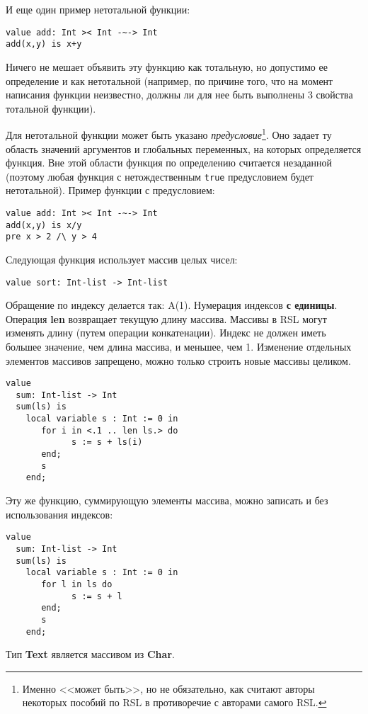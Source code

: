 И еще один пример нетотальной функции:
\begin{lstlisting}
value add: Int >< Int -~-> Int
add(x,y) is x+y
\end{lstlisting}
Ничего не мешает объявить эту функцию как тотальную, но допустимо ее определение и как нетотальной (например, по причине того, что на момент написания функции неизвестно, должны ли для нее быть выполнены 3 свойства тотальной функции).

Для нетотальной функции может быть указано \emph{предусловие}\footnote{Именно <<может быть>>, но не обязательно, как считают авторы некоторых пособий по RSL в противоречие с авторами самого RSL.}. Оно задает ту область значений аргументов и глобальных переменных, на которых определяется функция. Вне этой области функция по определению считается незаданной (поэтому любая функция с нетождественным \texttt{true} предусловием будет нетотальной). Пример функции с предусловием:
\begin{lstlisting}
value add: Int >< Int -~-> Int
add(x,y) is x/y
pre x > 2 /\ y > 4
\end{lstlisting}


Следующая функция использует массив целых чисел:
\begin{lstlisting}
value sort: Int-list -> Int-list
\end{lstlisting}

Обращение по индексу делается так: A(1). Нумерация индексов \textbf{с единицы}. Операция \textbf{len} возвращает текущую длину массива. Массивы в RSL могут изменять длину (путем операции конкатенации). Индекс не должен иметь большее значение, чем длина массива, и меньшее, чем 1. Изменение отдельных элементов массивов запрещено, можно только строить новые массивы целиком.

\begin{lstlisting}
value
  sum: Int-list -> Int
  sum(ls) is
    local variable s : Int := 0 in
       for i in <.1 .. len ls.> do
             s := s + ls(i)
       end;
       s
    end;
\end{lstlisting}


Эту же функцию, суммирующую элементы массива, можно записать и без использования индексов:
\begin{lstlisting}
value
  sum: Int-list -> Int
  sum(ls) is
    local variable s : Int := 0 in
       for l in ls do
             s := s + l
       end;
       s
    end;
\end{lstlisting}

Тип \textbf{Text} является массивом из \textbf{Char}.


